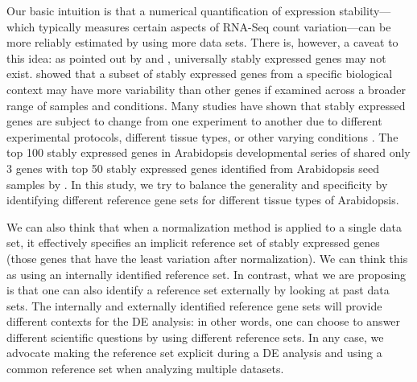 \documentclass[letterpaper,12pt]{article}
\begin{document}
Our basic intuition is that a numerical quantification of expression
stability---which typically measures certain aspects of RNA-Seq count
variation---can be more reliably estimated by using more data sets.  There is,
however, a caveat to this idea: as pointed out by \cite{fernandes2008selection} and \cite{hruz2011refgenes},
universally stably expressed genes may not exist. \cite{hruz2011refgenes} showed that a subset of stably
expressed genes from a specific biological context may have more variability
than other genes if examined across a broader range of samples and conditions.
Many studies have shown that stably expressed genes are subject to change from
one experiment to another due to different experimental protocols, different
tissue types, or other varying conditions \citep{reid2006optimized,
hong2010identification}.  The top 100 stably expressed genes in Arabidopsis
developmental series of \citet{czechowski2005genome} shared only 3 genes with
top 50 stably expressed genes identified from Arabidopsis seed samples by
\citet{dekkers2012identification}.  In this study, we try to balance the
generality and specificity by identifying different reference gene sets for
different tissue types of Arabidopsis. 



We can also think that when a normalization method is applied to a single data
set, it effectively specifies an implicit reference set of stably expressed
genes (those genes that have the least variation after normalization). We can think
this as using an internally identified reference set. In contrast, what we are
proposing is that one can also identify a reference set externally by looking
at past data sets. The internally and externally identified reference gene
sets will provide different contexts for the DE analysis: in other words, one
can choose to answer different scientific questions by using different
reference sets. In any case, we advocate  making the reference set explicit
during a DE analysis and using a common reference set when analyzing multiple
datasets. 

\end{document}
